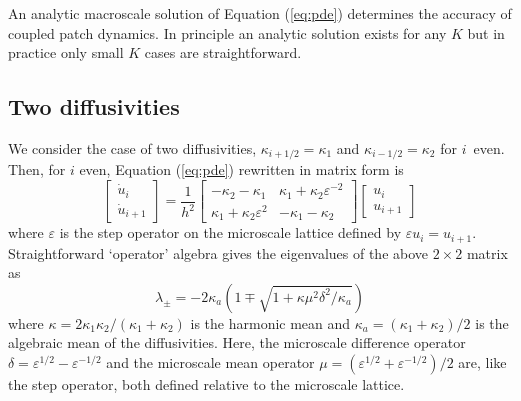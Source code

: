 \documentclass[12pt,a4paper]{article}
\begin{document}
An analytic macroscale solution of Equation (\ref{eq:pde}) determines the accuracy of coupled patch dynamics. In principle an analytic solution exists for any $K$ but in practice only small $K$ cases are straightforward.

\subsection{Two diffusivities}
We consider the case of two diffusivities, $\kappa_{i+1/2}=\kappa_1$ and $\kappa_{i-1/2}=\kappa_2$ for $i$~even. Then, for $i$ even, Equation (\ref{eq:pde}) rewritten in matrix form is 
\begin{equation}
\begin{bmatrix}
\dot{u}_i\\
\dot{u}_{i+1}
\end{bmatrix}=\frac{1}{h^2}\begin{bmatrix}
-\kappa_2-\kappa_1 & \kappa_1+\kappa_2\varepsilon ^{-2}\\
\kappa_1+\kappa_2\varepsilon ^2 & -\kappa_1-\kappa_2
\end{bmatrix}\begin{bmatrix}
u_i\\
u_{i+1}
\end{bmatrix}\label{eq:matrix}
\end{equation}
where  $\varepsilon $ is the step operator on the microscale lattice defined by $\varepsilon u_i=u_{i+1}$. Straightforward `operator' algebra gives the eigenvalues of the above $2\times 2$ matrix as
\begin{equation}
\lambda_{\pm}=-2\kappa_a\left(1\mp \sqrt{1+\kappa\mu^2\delta^2/\kappa_a}\right)
\end{equation}
where $\kappa=2\kappa_1\kappa_2/(\kappa_1+\kappa_2)$ is the harmonic mean and $\kappa_a=(\kappa_1+\kappa_2)/2$ is the algebraic mean of the diffusivities. Here,  the microscale difference operator $\delta=\varepsilon ^{1/2}-\varepsilon ^{-1/2}$ and the microscale mean operator $\mu=(\varepsilon ^{1/2}+\varepsilon ^{-1/2})/2$ are, like the step operator, both defined relative to the microscale lattice.
\end{document}
